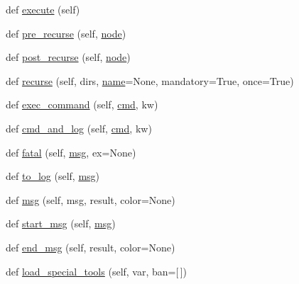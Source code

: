 \begin{DoxyCompactItemize}
def \hyperlink{classwaflib_1_1_context_1_1_context_ae98aa77cb954743799c5b730c6775329}{execute} (self)
\item 
def \hyperlink{classwaflib_1_1_context_1_1_context_a290c81ad18ad9b3c0bcbde2d8fce519e}{pre\+\_\+recurse} (self, \hyperlink{structnode}{node})
\item 
def \hyperlink{classwaflib_1_1_context_1_1_context_ab818cd610ecc0c6fa981f0cde9f3dd13}{post\+\_\+recurse} (self, \hyperlink{structnode}{node})
\item 
def \hyperlink{classwaflib_1_1_context_1_1_context_a10e3b0d5e63bb03a0a7adbb32c3dceab}{recurse} (self, dirs, \hyperlink{lib_2expat_8h_a1b49b495b59f9e73205b69ad1a2965b0}{name}=None, mandatory=True, once=True)
\item 
def \hyperlink{classwaflib_1_1_context_1_1_context_aaa7d209a0d05f2f8e45fc11b83c72dba}{exec\+\_\+command} (self, \hyperlink{sndfile__play_8m_adfc5ba7e22f5e4a6221c12a70503bef3}{cmd}, kw)
\item 
def \hyperlink{classwaflib_1_1_context_1_1_context_aaa63c5a7ac60f1bf164febe6642d270f}{cmd\+\_\+and\+\_\+log} (self, \hyperlink{sndfile__play_8m_adfc5ba7e22f5e4a6221c12a70503bef3}{cmd}, kw)
\item 
def \hyperlink{classwaflib_1_1_context_1_1_context_a42739307965d7ef470985d7bb7408788}{fatal} (self, \hyperlink{classwaflib_1_1_context_1_1_context_a7495a2e04e528aa54bda3cadf08240cb}{msg}, ex=None)
\item 
def \hyperlink{classwaflib_1_1_context_1_1_context_a596fa2d8dc5a61602101f43ec1eb3e7e}{to\+\_\+log} (self, \hyperlink{classwaflib_1_1_context_1_1_context_a7495a2e04e528aa54bda3cadf08240cb}{msg})
\item 
def \hyperlink{classwaflib_1_1_context_1_1_context_a7495a2e04e528aa54bda3cadf08240cb}{msg} (self, msg, result, color=None)
\item 
def \hyperlink{classwaflib_1_1_context_1_1_context_a344a0dff2c7b0d2d76057d55b83c3f16}{start\+\_\+msg} (self, \hyperlink{classwaflib_1_1_context_1_1_context_a7495a2e04e528aa54bda3cadf08240cb}{msg})
\item 
def \hyperlink{classwaflib_1_1_context_1_1_context_a6340799a7fa4dc1230d13b7c08eec789}{end\+\_\+msg} (self, result, color=None)
\item 
def \hyperlink{classwaflib_1_1_context_1_1_context_a95a53e6c363450df77f847bec6c56696}{load\+\_\+special\+\_\+tools} (self, var, ban=\mbox{[}$\,$\mbox{]})
\end{DoxyCompactItemize}
